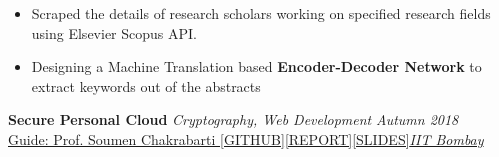 \documentclass[10pt]{article}
\def\projectSpace{\vspace{-5pt}}
\def\projectFirstSpace{\vspace{-18pt}}
\begin{document}
\projectFirstSpace

 \begin{itemize}[itemsep = -0.75 mm, leftmargin=*]

   \item Scraped the details of research scholars working on specified research fields using Elsevier Scopus API.
    \item Designing a Machine Translation based \textbf{Encoder-Decoder Network} to extract keywords out of the abstracts


 \end{itemize}
 \vspace*{8pt}

\projectSpace

\hspace*{-18 pt}
\textbf{\large Secure Personal Cloud} \textemdash \textit{ Cryptography, Web Development} \hfill{\sl \small Autumn 2018}\\
\href{https://www.cse.iitb.ac.in/~soumen/}{Guide: Prof. Soumen Chakrabarti }\hspace{10pt}\href{https://github.com/yashkhem1/Secure-Personal-Cloud}{[GITHUB]}\hspace{3pt}\href{https://drive.google.com/file/d/1CcG8579Tiep_GSqL0PeUegmRzgruPQU5/view?usp=sharing}{[REPORT]}\hspace{3pt}\href{https://drive.google.com/file/d/1ofUqrwGmyYmDidKF6bzoX-IasWaaSryG/view?usp=sharing}{[SLIDES]}\hfill{\sl \small \href{http://www.iitb.ac.in/}{IIT Bombay}\ \ }\\
\vspace{1pt}

\projectFirstSpace
\end{document}
